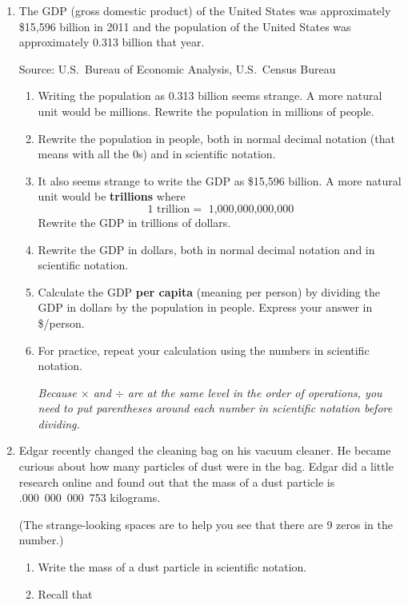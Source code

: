 \begin{enumerate}

\item The GDP (gross domestic product) of the United States was approximately \$15,596 billion in 2011 and the population of the United States was approximately 0.313 billion that year.  \hfill \begin{footnotesize} Source:  U.S.\ Bureau of Economic Analysis, U.S.\ Census Bureau\end{footnotesize}
\begin{enumerate}
\item Writing the population as 0.313 billion seems strange.  A more natural unit would be millions.  Rewrite the population in millions of people. \vfill
\item Rewrite the population in people, both in normal decimal notation (that means with all the 0s) and in scientific notation. \vfill
\item It also seems strange to write the GDP as \$15,596 billion.   A more natural unit would be \textbf{trillions} where
$$1 \text{ trillion} =  \text{ 1,000,000,000,000}$$
Rewrite the GDP in trillions of dollars. \vfill
\item Rewrite the GDP in dollars, both in normal decimal notation and in scientific notation. \vfill
\item Calculate the GDP \textbf{per capita} (meaning per person) by dividing the GDP in dollars by the population in people.  Express your answer in \$/person. \vfill
\item For practice, repeat your calculation using the numbers in scientific notation.  
 
 \emph{Because $\times$ and $\div$ are at the same level in the order of operations, you need to put parentheses around each number in scientific notation before dividing.} \vfill
\end{enumerate}

\newpage %

\item Edgar recently changed the cleaning bag on his vacuum cleaner.  He became curious about how many particles of dust were in the bag.  Edgar did a little research online and found out that the mass of a dust particle is .000~000~000~753 kilograms.  

(The strange-looking spaces are to help you see that there are 9 zeros in the number.)
\begin{enumerate}
\item Write the mass of a dust particle in scientific notation. \vfill
\item Recall that 


\end{enumerate}
\end{enumerate}
